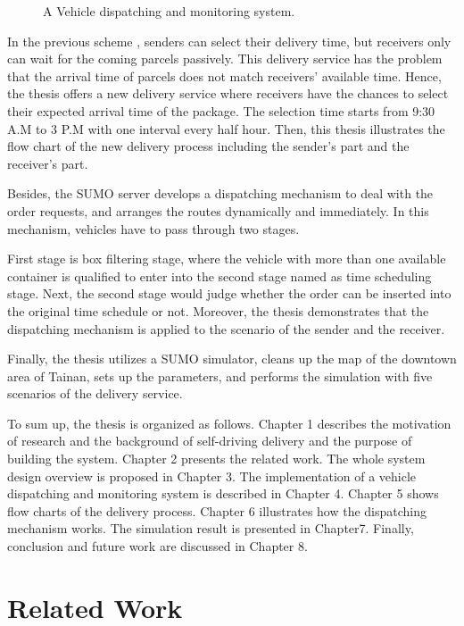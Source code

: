 \documentclass[12pt]{ksthesis}
\begin{document}
\begin{thesis}
{\begin{figure}[t]
\caption{\large A Vehicle dispatching and monitoring system.}
\vspace{0.5cm}
\label{Fig:System_Overview}
\end{figure}

In the previous scheme \cite{Jiang2018}, senders can select their delivery time, but receivers only can wait for the coming parcels passively. This delivery service has the problem that the arrival time of parcels does not match receivers’ available time. Hence, the thesis offers a new delivery service where receivers have the chances to select their expected arrival time of the package. The selection time starts from 9:30 A.M to 3 P.M with one interval every half hour. Then, this thesis illustrates the flow chart of the new delivery process including the sender’s part and the receiver’s part.

Besides, the SUMO server develops a dispatching mechanism to deal with the order requests, and arranges the routes dynamically and immediately. In this mechanism, vehicles have to pass through two stages. 

First stage is box filtering stage, where the vehicle with more than one available container is qualified to enter into the second stage named as  time scheduling stage. Next, the second stage would judge whether the order can be inserted into the original time schedule or not. Moreover, the thesis demonstrates that the dispatching mechanism is applied to the scenario of the sender and the receiver.

Finally, the thesis utilizes a SUMO simulator, cleans up the map of the downtown area of Tainan, sets up the parameters, and performs the simulation with five scenarios of the delivery service.

To sum up, the thesis is organized as follows. Chapter 1 describes the motivation of research and the background of self-driving delivery and the purpose of building the system. Chapter 2 presents the related work. The whole system design overview is proposed in Chapter 3. The implementation of a vehicle dispatching and monitoring system is described in Chapter 4. Chapter 5 shows flow charts of the delivery process.  Chapter 6 illustrates how the dispatching mechanism works. The simulation result is presented in Chapter7. Finally, conclusion and future work are discussed in Chapter 8.


  


\chapter{Related Work} \label{Chap:Related}

}
\end{thesis}
\end{document}
